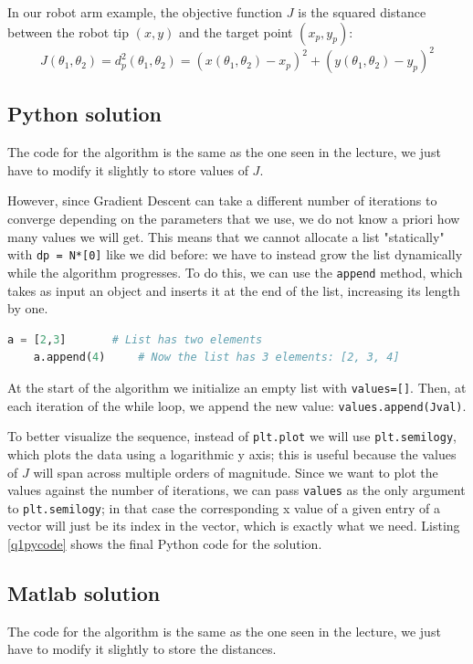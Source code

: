\documentclass{article}
\newcommand{\py}[1]{\texttt{\lstinline!#1!}}
\begin{document}
In our robot arm example, the objective function $J$ is the squared distance between the robot tip $(x, y)$ and the target point $(x_p, y_p)$:
\begin{equation}
	J(\theta_1, \theta_2) =d_p^2(\theta_1, \theta_2) = (x(\theta_1, \theta_2)-x_p)^2 + (y(\theta_1, \theta_2)-y_p)^2
\end{equation}


\subsection{Python solution}
The code for the algorithm is the same as the one seen in the lecture, we just have to modify it slightly to store values of $J$. 

However, since Gradient Descent can take a different number of iterations to converge depending on the parameters that we use, we do not know a priori how many values we will get. This means that we cannot allocate a list "statically" with \py{dp = N*[0]} like we did before: we have to instead grow the list dynamically while the algorithm progresses. 
To do this, we can use the \py{append} method, which takes as input an object and inserts it at the end of the list, increasing its length by one.

\begin{lstlisting}[language=Python]
    a = [2,3]       # List has two elements
    a.append(4)     # Now the list has 3 elements: [2, 3, 4]
\end{lstlisting}

At the start of the algorithm we initialize an empty list with \py{values=[]}. Then, at each iteration of the while loop, we append the new value: \py{values.append(Jval)}.

To better visualize the sequence, instead of \py{plt.plot} we will use \py{plt.semilogy}, which plots the data using a logarithmic y axis; this is useful because the values of $J$ will span across multiple orders of magnitude.
Since we want to plot the values against the number of iterations, we can pass \py{values} as the only argument to \py{plt.semilogy}; in that case the corresponding x value of a given entry of a vector will just be its index in the vector, which is exactly what we need.
Listing \ref{q1pycode} shows the final Python code for the solution.



\subsection{Matlab solution}
The code for the algorithm is the same as the one seen in the lecture, we just have to modify it slightly to store the distances. 
\end{document}
